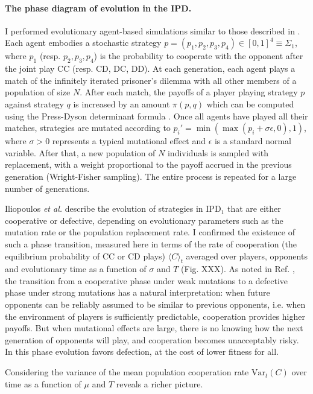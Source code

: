 \documentclass[12pt]{article}
\def\IPD{\textrm{IPD}}
\def\IPD1{\textrm{IPD}_1}
\begin{document}
\paragraph*{The phase diagram of evolution in the IPD.} I performed evolutionary agent-based simulations similar to those described in \cite{iliopoulos_critical_2010}. Each agent embodies a stochastic strategy $p=(p_1, p_2, p_3, p_4)\in[0,1]^4 \equiv \Sigma_1$, where $p_1$ (resp. $p_2, p_3, p_4$) is the probability to cooperate with the opponent after the joint play CC (resp. CD, DC, DD). At each generation, each agent plays a match of the infinitely iterated prisoner's dilemma with all other members of a population of size $N$. After each match, the payoffs of a player playing strategy $p$ against strategy $q$ is increased by an amount $\pi(p,q)$ which can be computed using the Press-Dyson determinant formula \cite{press_iterated_2012}. Once all agents have played all their matches, strategies are mutated according to $p_i' = \min(\max(p_i + \sigma \epsilon, 0), 1)$, where $\sigma > 0$ represents a typical mutational effect and $\epsilon$ is a standard normal variable. After that, a new population of $N$ individuals is sampled with replacement, with a weight proportional to the payoff accrued in the previous generation (Wright-Fisher sampling). The entire process is repeated for a large number of generations. 

Iliopoulos \emph{et al.} describe the evolution of strategies in $\IPD1$ that are either cooperative or defective, depending on evolutionary parameters such as the mutation rate or the population replacement rate. I confirmed the existence of such a phase transition, measured here in terms of the rate of cooperation (the equilibrium probability of CC or CD plays) $\langle C\rangle_t$ averaged over players, opponents and evolutionary time as a function of $\sigma$ and $T$ (Fig. XXX). As noted in Ref. \cite{iliopoulos_critical_2010}, the transition from a cooperative phase under weak mutations to a defective phase under strong mutations has a natural interpretation: when future opponents can be reliably assumed to be similar to previous opponents, i.e. when the environment of players is sufficiently predictable, cooperation provides higher payoffs. But when mutational effects are large, there is no knowing how the next generation of opponents will play, and cooperation becomes unacceptably risky. In this phase evolution favors defection, at the cost of lower fitness for all.

Considering the variance of the mean population cooperation rate $\textrm{Var}_t(C)$ over time as a function of $\mu$ and $T$ reveals a richer picture. 
\end{document}
